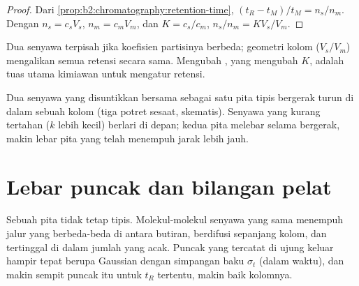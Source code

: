 \begin{proof}
Dari \cref{prop:b2:chromatography:retention-time}, $(t_R - t_M)/t_M = n_s/n_m$. Dengan $n_s = c_sV_s$,
$n_m = c_mV_m$, dan $K = c_s/c_m$, $n_s/n_m = KV_s/V_m$.
\end{proof}

Dua senyawa terpisah jika koefisien partisinya berbeda; geometri kolom
($V_s/V_m$) mengalikan semua retensi secara sama. Mengubah , yang
mengubah $K$, adalah tuas utama kimiawan untuk mengatur retensi.

\begin{omfigure}
\par\vspace{4pt}

{\small Dua senyawa yang disuntikkan bersama sebagai satu pita tipis bergerak
turun di dalam sebuah kolom (tiga potret sesaat, skematis). Senyawa yang
kurang tertahan ($k$ lebih kecil) berlari di depan; kedua pita melebar
selama bergerak, makin lebar pita yang telah menempuh jarak lebih jauh.}
\end{omfigure}

\section{Lebar puncak dan bilangan pelat}

Sebuah pita tidak tetap tipis. Molekul-molekul senyawa yang sama menempuh
jalur yang berbeda-beda di antara butiran, berdifusi sepanjang kolom, dan
tertinggal di  dalam jumlah yang acak. Puncak yang tercatat di
ujung keluar hampir tepat berupa Gaussian dengan simpangan baku $\sigma_t$
(dalam waktu), dan makin sempit puncak itu untuk $t_R$ tertentu, makin baik
kolomnya.


